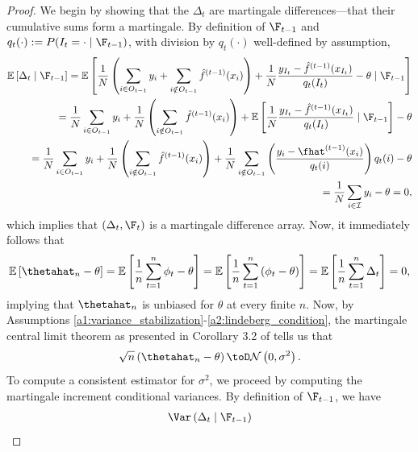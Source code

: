 \documentclass[11pt]{article}
\begin{document}
\begin{proof}
    We begin by showing that the $\Delta_t$ are martingale differences---that their cumulative sums form a martingale. By definition of $\F_{t-1}$ and $q_t(\cdot) := P(I_t = \cdot \mid \F_{t-1})$, with division by $q_t(\cdot)$ well-defined by assumption,
    \begin{align*}
        \mathbb{E}\left[ \Delta_t \mid \F_{t-1} \right] = \mathbb{E}\left[ \frac{1}{N}\left( \sum_{i \in O_{t-1}} y_i + \sum_{i \notin O_{t-1}} \hat{f}^{(t-1)}(x_{i}) \right) + \frac{1}{N}\frac{y_{I_t} - \hat{f}^{(t-1)}(x_{I_t})}{q_t(I_t)} - \theta \mid \F_{t-1}\right]\\
        = \frac{1}{N} \sum_{i \in O_{t-1}} y_i + \frac{1}{N}\left( \sum_{i \notin O_{t-1}} \hat{f}^{(t-1)}(x_{i}) \right) + \mathbb{E}\left[\frac{1}{N}\frac{y_{I_t} - \hat{f}^{(t-1)}(x_{I_t})}{q_t(I_t)} \mid \F_{t-1} \right] - \theta \\
        = \frac{1}{N} \sum_{i \in O_{t-1}} y_i + \frac{1}{N}\left( \sum_{i \notin O_{t-1}} \hat{f}^{(t-1)}(x_{i}) \right) + \frac{1}{N} \sum_{i \notin O_{t-1}} \left( \frac{y_i - \fhat^{(t-1)}(x_i)}{q_t(i)} \right) q_t(i) - \theta\\
        = \frac{1}{N} \sum_{i \in \mathcal{I}} y_i - \theta = 0,
    \end{align*}
    which implies that $(\Delta_t, \F_t)$ is a martingale difference array. Now, it immediately follows that
    \begin{align*}
        \mathbb{E}\left[ \thetahat_n - \theta \right] = \mathbb{E}\left[ \frac{1}{n}\sum_{t=1}^n \phi_t - \theta \right] = \mathbb{E}\left[ \frac{1}{n}\sum_{t=1}^n \left( \phi_t - \theta \right) \right] = \mathbb{E}\left[ \frac{1}{n}\sum_{t=1}^n \Delta_t \right] = 0,
    \end{align*}
    implying that $\thetahat_n$ is unbiased for $\theta$ at every finite $n$. Now, by Assumptions \ref{a1:variance_stabilization}-\ref{a2:lindeberg_condition}, the martingale central limit theorem as presented in Corollary 3.2 of \cite{hall2014martingale} tells us that
    \begin{align*}
        \sqrt{n}\left( \thetahat_n - \theta \right) \toD \mathcal{N}\left( 0, \sigma^2 \right).
    \end{align*}
    To compute a consistent estimator for $\sigma^2$, we proceed by computing the martingale increment conditional variances. By definition of $\F_{t-1}$, we have
    \begin{align*}
        \Var\left( \Delta_t \mid \F_{t-1} \right)\\

\end{align*}
\end{proof}
\end{document}
